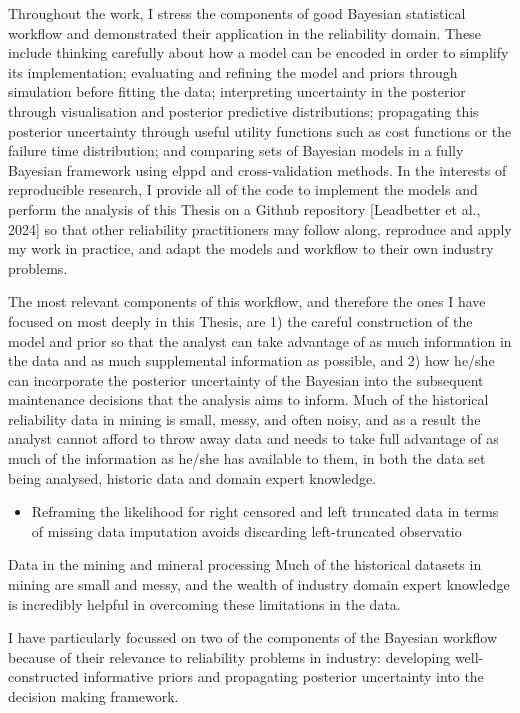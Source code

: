 Throughout the work, I stress the components of good Bayesian statistical workflow and demonstrated their application in the reliability domain. These include thinking carefully about how a model can be encoded in order to simplify its implementation; evaluating and refining the model and priors through simulation before fitting the data; interpreting uncertainty in the posterior through visualisation and posterior predictive distributions; propagating this posterior uncertainty through useful utility functions such as cost functions or the failure time distribution; and comparing sets of Bayesian models in a fully Bayesian framework using elppd and cross-validation methods. In the interests of reproducible research, I provide all of the code to implement the models and perform the analysis of this Thesis on a Github repository [Leadbetter et al., 2024] so that other reliability practitioners may follow along, reproduce and apply my work in practice, and adapt the models and workflow to their own industry problems.

The most relevant components of this workflow, and therefore the ones I have focused on most deeply in this Thesis, are 1) the careful construction of the model and prior so that the analyst can take advantage of as much information in the data and as much supplemental information as possible, and 2) how he/she can incorporate the posterior uncertainty of the Bayesian into the subsequent maintenance decisions that the analysis aims to inform. 
Much of the historical reliability data in mining is small, messy, and often noisy, and as a result the analyst cannot afford to throw away data and needs to take full advantage of as much of the information as he/she has available to them, in both the data set being analysed, historic data and domain expert knowledge.
\begin{itemize}
  \item Reframing the likelihood for right censored and left truncated data in terms of missing data imputation avoids discarding left-truncated observatio
\end{itemize} 
Data in the mining and mineral processing Much of the historical datasets in mining are small and messy, and the wealth of industry domain expert knowledge is incredibly helpful in overcoming these limitations in the data.

I have particularly focussed on two of the components of the Bayesian workflow because of their relevance to reliability problems in industry: developing well-constructed informative priors and propagating posterior uncertainty into the decision making framework.

